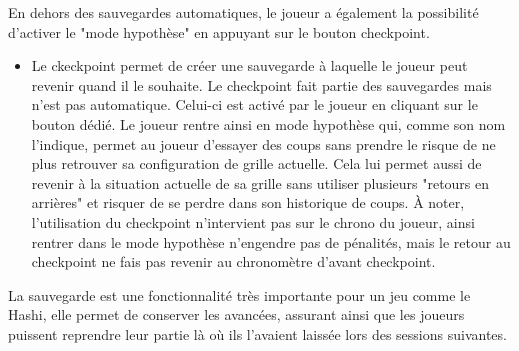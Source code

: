 {    En dehors des sauvegardes automatiques, le joueur a également la possibilité d'activer le "mode hypothèse" en appuyant sur le bouton checkpoint. 

     \begin{itemize}
        \item {}
        {Le ckeckpoint permet de créer une sauvegarde à laquelle le joueur peut revenir quand il le souhaite.}
        {
        Le checkpoint fait partie des sauvegardes mais n'est pas automatique. Celui-ci est activé par le joueur en cliquant sur le bouton dédié. Le joueur rentre ainsi en mode hypothèse qui, comme son nom l'indique, permet au joueur d'essayer des coups sans prendre le risque de ne plus retrouver sa configuration de grille actuelle. Cela lui permet aussi de revenir à la situation actuelle de sa grille sans utiliser plusieurs "retours en arrières" et risquer de se perdre dans son historique de coups. À noter, l'utilisation du checkpoint n'intervient pas sur le chrono du joueur, ainsi rentrer dans le mode hypothèse n'engendre pas de pénalités, mais le retour au checkpoint ne fais pas revenir au chronomètre d'avant checkpoint.
        }
    \end{itemize}
}
{
    La sauvegarde est une fonctionnalité très importante pour un jeu comme le Hashi, elle permet de conserver les avancées, assurant ainsi que les joueurs puissent reprendre leur partie là où ils l'avaient laissée lors des sessions suivantes.
}
